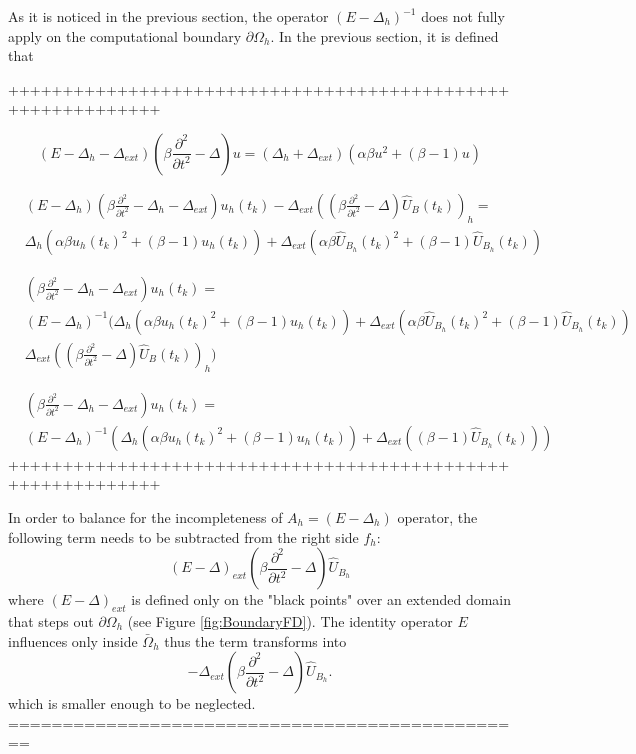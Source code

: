 \documentclass[11pt,a4paper,twoside]{article}
\begin{document}
As it is noticed in the previous section, the operator $(E - \Delta_h)^{-1}$ does not fully apply on the computational boundary $\partial \Omega_h$. In the previous section, it is defined that

++++++++++++++++++++++++++++++++++++++++++++++++++++++++++++

\begin{equation}
(E-\Delta_h -\Delta_{ext})(\beta \frac{ \partial^2 } { \partial t^2 } - \Delta) u =( \Delta_h + \Delta_{ext}) ( \alpha \beta u^2  + (\beta -1)u) 
\end{equation}

\begin{align}
&(E-\Delta_h)(\beta \frac{ \partial^2 } { \partial t^2 } - \Delta_h - \Delta_{ext}) u_h(t_k) - \Delta_{ext}((\beta \frac{ \partial^2 } { \partial t^2 } - \Delta)\widehat U_B(t_k))_h = 
\\
&\Delta_h ( \alpha \beta u_h(t_k)^2  + (\beta -1)u_h(t_k)) +  \Delta_{ext} ( \alpha \beta\widehat U_{B_h}(t_k)^2  + (\beta -1)\widehat U_{B_h}(t_k))  
\end{align}

\begin{align}
&(\beta \frac{ \partial^2 } { \partial t^2 } - \Delta_h - \Delta_{ext}) u_h(t_k)  = 
\\
&(E-\Delta_h)^{-1} ( \Delta_h ( \alpha \beta u_h(t_k)^2  + (\beta -1)u_h(t_k)) +  \Delta_{ext} ( \alpha \beta\widehat U_{B_h}(t_k)^2  + (\beta -1)\widehat U_{B_h}(t_k))   \nonumber
\\
&\Delta_{ext}((\beta \frac{ \partial^2 } { \partial t^2 } - \Delta)\widehat U_B(t_k))_h )
\end{align}

\begin{align}
&(\beta \frac{ \partial^2 } { \partial t^2 } - \Delta_h - \Delta_{ext}) u_h(t_k)  = 
\\
&(E-\Delta_h)^{-1} ( \Delta_h ( \alpha \beta u_h(t_k)^2  + (\beta -1)u_h(t_k)) +  \Delta_{ext} ( (\beta -1)\widehat U_{B_h}(t_k))  )
\end{align}
++++++++++++++++++++++++++++++++++++++++++++++++++++++++++++

In order to balance for the incompleteness of $A_h = (E-\Delta_h)$ operator, the following term needs to be subtracted from the right side $f_h$:
\begin{equation*}
(E-\Delta)_{ext}(\beta \frac{ \partial^2 } { \partial t^2 } - \Delta) \widehat U_{B_h}
\end{equation*}
where $(E-\Delta)_{ext}$ is defined only on the "black points" over an extended domain that steps out $\partial \Omega_h$ (see Figure \ref{fig:BoundaryFD}). The identity operator $E$ influences only inside $\bar \Omega_h$ thus the term transforms into
\begin{equation*}
-\Delta_{ext}(\beta \frac{ \partial^2 } { \partial t^2 } - \Delta) \widehat U_{B_h}.
\end{equation*}
which is smaller enough to be neglected.
================================================
\fi
\end{document}
